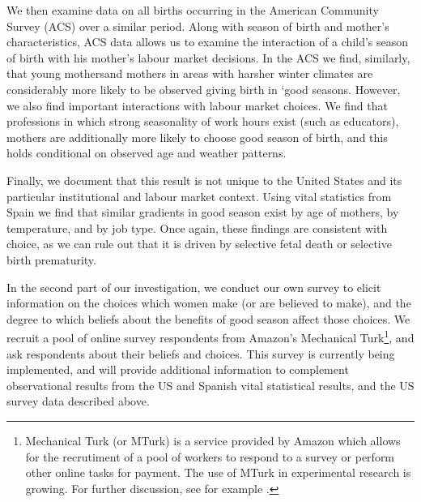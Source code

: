\documentclass[a4paper, 12 pt]{article}
\theoremstyle{plain}
\begin{document}
\begin{doublespace}
We then examine data on all births occurring in the American Community Survey (ACS) over a similar period.  Along with season of birth and mother's characteristics, ACS data allows us to examine the interaction of a child's season of birth with his mother's labour market decisions.  In the ACS we find, similarly, that young mothersand mothers in areas with harsher winter climates are considerably more likely to be observed giving birth in `good seasons.  However, we also find important interactions with labour market choices.  We find that professions in which strong seasonality of work hours exist (such as educators), mothers are additionally more likely to choose good season of birth, and this holds conditional on observed age and weather patterns.

Finally, we document that this result is not unique to the United States and its particular institutional and labour market context.  Using vital statistics from Spain we find that similar gradients in good season exist by age of mothers, by temperature, and by job type.  Once again, these findings are consistent with choice, as we can rule out that it is driven by selective fetal death or selective birth prematurity.

In the second part of our investigation, we conduct our own survey to elicit information on the choices which women make (or are believed to make), and the degree to which beliefs about the benefits of good season affect those choices.  We recruit a pool of online survey respondents from Amazon's Mechanical Turk\footnote{Mechanical Turk (or MTurk) is a service provided by Amazon which allows for the recrutiment of a pool of workers to respond to a survey or perform other online tasks for payment.  The use of MTurk in experimental research is growing.  For further discussion, see for example \citet{Berinskyetal2012}.}, and ask respondents about their beliefs and choices.  This survey is currently being implemented, and will provide additional information to complement observational results from the US and Spanish vital statistical results, and the US survey data described above.



\end{doublespace}
\end{document}
